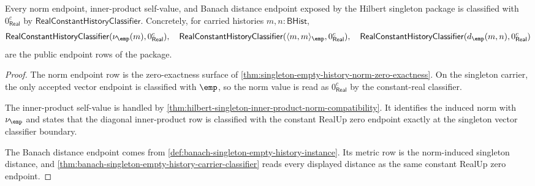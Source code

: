 \begin{theorem}
\label{thm:hilbert-singleton-endpoint-readback}
Every norm endpoint, inner-product self-value, and Banach distance endpoint
exposed by the Hilbert singleton package is classified with
$0_{\mathsf{Real}}^{c}$ by
$\mathsf{RealConstantHistoryClassifier}$. Concretely, for carried histories
$m,n:\mathsf{BHist}$,
$$
\mathsf{RealConstantHistoryClassifier}(\nu_{\emp}(m),0_{\mathsf{Real}}^{c}),
\quad
\mathsf{RealConstantHistoryClassifier}
  (\langle m,m\rangle_{\emp},0_{\mathsf{Real}}^{c}),
\quad
\mathsf{RealConstantHistoryClassifier}(d_{\emp}(m,n),0_{\mathsf{Real}}^{c})
$$
are the public endpoint rows of the package.
\end{theorem}
\begin{proof}
The norm endpoint row is the zero-exactness surface of
\autoref{thm:singleton-empty-history-norm-zero-exactness}. On the singleton
carrier, the only accepted vector endpoint is classified with $\emp$, so the
norm value is read as $0_{\mathsf{Real}}^{c}$ by the constant-real
classifier.

The inner-product self-value is handled by
\autoref{thm:hilbert-singleton-inner-product-norm-compatibility}. It identifies
the induced norm with $\nu_{\emp}$ and states that the diagonal
inner-product row is classified with the constant RealUp zero endpoint
exactly at the singleton vector classifier boundary.

The Banach distance endpoint comes from
\autoref{def:banach-singleton-empty-history-instance}. Its metric row is the
norm-induced singleton distance, and
\autoref{thm:banach-singleton-empty-history-carrier-classifier} reads every
displayed distance as the same constant RealUp zero endpoint.
\end{proof}
